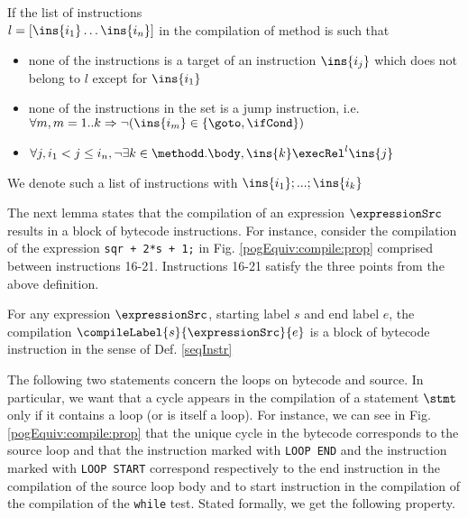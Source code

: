 \begin{seqInstr} \label{seqInstr}
If the list of  instructions \\ $l  = \lbrack \ins{i_1} \ldots \ins{i_n} \rbrack$ in the compilation of method \methodd is such that 
 \begin{itemize}
      \item none of the instructions is a target of an instruction $\ins{i_j}$ which does not belong to $l$ except for $\ins{i_1}$
      \item none of the instructions in the set is a jump instruction, i.e. $\forall m, m = 1..k \Rightarrow \neg( \ins{i_m} \in  \{\goto, \ifCond\} )  $ 
      \item $  \forall j, i_1 <  j \le i_n , \neg \exists k \in \methodd.\body, \ins{k} \execRel^{l} \ins{j} $ 
 \end{itemize}

We denote such a list of instructions with $\ins{i_1};...;\ins{i_k}$

\end{seqInstr}


The next lemma states that the compilation of an expression $\expressionSrc$ results in
 a block of bytecode instructions.  For instance, consider the compilation of the expression \lstinline!sqr + 2*s + 1;! in Fig. \ref{pogEquiv:compile:prop}  
 comprised between instructions 16-21. Instructions  16-21 satisfy the three points from the above definition.
\begin{compProp3}\label{compile:prop:compProp3}
    For any expression $\expressionSrc$, starting label $s$ and end label $e$,
    the compilation $\compileLabel{s}{\expressionSrc}{e}$ is a block of bytecode instruction in the sense of Def. \ref{seqInstr}
   
\end{compProp3}


The following two statements concern the loops on bytecode and source. 
In particular, we want that a cycle appears in the compilation of a statement  $\stmt$  only if it contains a loop (or is itself a loop).
For instance, we can  see in Fig. \ref{pogEquiv:compile:prop} that the unique cycle in the bytecode corresponds to the source loop and that the 
instruction marked with \lstinline!LOOP END! and the instruction marked with \lstinline!LOOP START! correspond respectively to the end instruction   in the 
compilation of the source loop body   and to start instruction in the compilation of the compilation of the \lstinline!while! test. 
Stated formally, we get the following property. 


